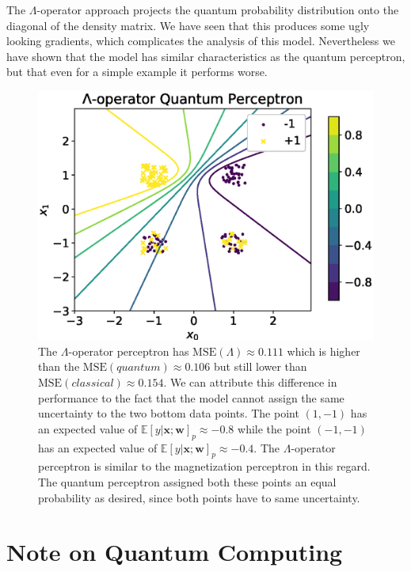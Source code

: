 \noindent The $\Lambda$-operator approach projects the quantum probability distribution onto the diagonal of the density matrix. We have seen that this produces some ugly looking gradients, which complicates the analysis of this model. Nevertheless we have shown that the model has similar characteristics as the quantum perceptron, but that even for a simple example it performs worse.

\begin{figure}[ht!]
\centering
    \includegraphics[width=1\linewidth]{figures/chapter3/amin.eps}
    \caption{The $\Lambda$-operator perceptron has $\text{MSE}(\Lambda) \approx 0.111$ which is higher than the $\text{MSE}(quantum) \approx 0.106$ but still lower than $\text{MSE}(classical) \approx 0.154$. We can attribute this difference in performance to the fact that the model cannot assign the same uncertainty to the two bottom data points. The point $(1,-1)$ has an expected value of $\mathbb{E}[y|\mathbf{x};\mathbf{w}]_p\approx-0.8$ while the point $(-1,-1)$ has an expected value of $\mathbb{E}[y|\mathbf{x};\mathbf{w}]_p\approx -0.4$. The $\Lambda$-operator perceptron is similar to the magnetization perceptron in this regard. The quantum perceptron assigned both these points an equal probability as desired, since both points have to same uncertainty.}
    \label{fig:amin}
\end{figure}

\section{Note on Quantum Computing}

